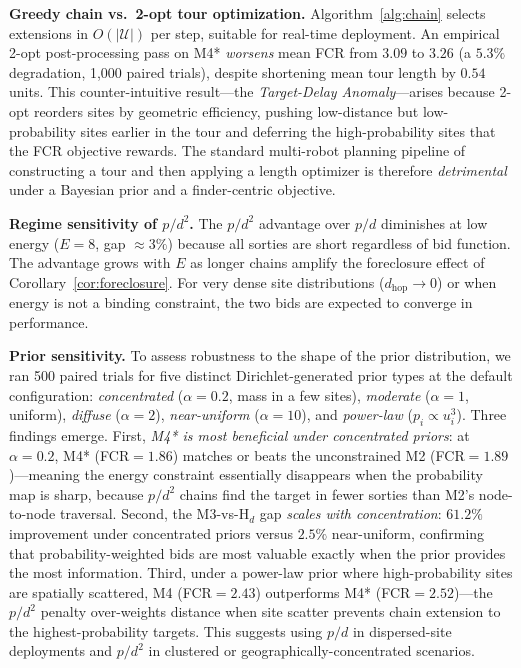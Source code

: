 \documentclass[conference]{IEEEtran}
\begin{document}
\textbf{Greedy chain vs.\ 2-opt tour optimization.}
Algorithm~\ref{alg:chain} selects extensions in $O(|\mathcal{U}|)$ per step,
suitable for real-time deployment.
An empirical 2-opt post-processing pass on M4* \emph{worsens} mean FCR from
$3.09$ to $3.26$ (a $5.3\%$ degradation, 1,000 paired trials), despite
shortening mean tour length by $0.54$ units.
This counter-intuitive result---the \emph{Target-Delay Anomaly}---arises
because 2-opt reorders sites by geometric efficiency, pushing low-distance
but low-probability sites earlier in the tour and deferring the
high-probability sites that the FCR objective rewards.
The standard multi-robot planning pipeline of constructing a tour and then
applying a length optimizer is therefore \emph{detrimental} under a Bayesian
prior and a finder-centric objective.

\textbf{Regime sensitivity of $p/d^2$.}
The $p/d^2$ advantage over $p/d$ diminishes at low energy ($E{=}8$, gap
${\approx}3\%$) because all sorties are short regardless of bid function.
The advantage grows with $E$ as longer chains amplify the foreclosure effect
of Corollary~\ref{cor:foreclosure}.
For very dense site distributions ($d_{\mathrm{hop}} \to 0$) or when energy
is not a binding constraint, the two bids are expected to converge in
performance.

\textbf{Prior sensitivity.}
To assess robustness to the shape of the prior distribution, we ran 500
paired trials for five distinct Dirichlet-generated prior types at the
default configuration: \emph{concentrated} ($\alpha{=}0.2$, mass in a
few sites), \emph{moderate} ($\alpha{=}1$, uniform), \emph{diffuse}
($\alpha{=}2$), \emph{near-uniform} ($\alpha{=}10$), and \emph{power-law}
($p_i \propto u_i^3$).
Three findings emerge.
First, \emph{M4* is most beneficial under concentrated priors}: at
$\alpha{=}0.2$, M4* (FCR$=1.86$) matches or beats the unconstrained M2
(FCR$=1.89$)---meaning the energy constraint essentially disappears when
the probability map is sharp, because $p/d^2$ chains find the target in
fewer sorties than M2's node-to-node traversal.
Second, the M3-vs-$\mathrm{H}_d$ gap \emph{scales with concentration}:
$61.2\%$ improvement under concentrated priors versus $2.5\%$ near-uniform,
confirming that probability-weighted bids are most valuable exactly when
the prior provides the most information.
Third, under a power-law prior where high-probability sites are
spatially scattered, M4 (FCR$=2.43$) outperforms M4* (FCR$=2.52$)---the
$p/d^2$ penalty over-weights distance when site scatter prevents chain
extension to the highest-probability targets.
This suggests using $p/d$ in dispersed-site deployments and $p/d^2$
in clustered or geographically-concentrated scenarios.
\end{document}
